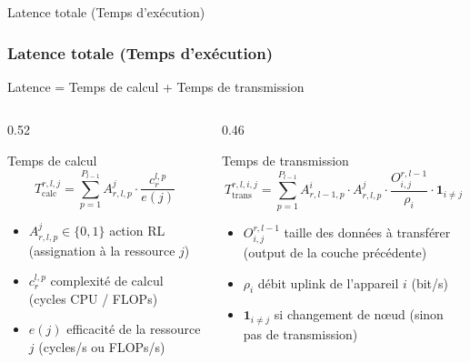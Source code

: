 \documentclass[10pt,aspectratio=169]{beamer}
\begin{document}
\begin{frame}{Latence totale (Temps d'exécution)}
\frametitle{Latence totale (Temps d'exécution)}

Latence = Temps de calcul + Temps de transmission

\bigskip

\begin{columns}[T]  %
\begin{column}{0.52\textwidth}

\begin{block}{Temps de calcul}
\[
T_{\text{calc}}^{r,l,j} = \sum_{p=1}^{P_{l-1}} A^j_{r,l,p} \cdot \frac{c^{l,p}_r}{e(j)}
\]
\end{block}

\begin{itemize}
\item $A^j_{r,l,p} \in \{0,1\}$ \quad action RL (assignation à la ressource $j$)
\item $c^{l,p}_r$ \quad complexité de calcul (cycles CPU / FLOPs)
\item $e(j)$ \quad efficacité de la ressource $j$ (cycles/s ou FLOPs/s)
\end{itemize}

\end{column}

\begin{column}{0.46\textwidth}

\begin{block}{Temps de transmission}
\[
T_{\text{trans}}^{r,l,i,j} = \sum_{p=1}^{P_{l-1}} A^i_{r,{l-1},p} \cdot A^j_{r,l,p} \cdot \frac{O^{r,l-1}_{i,j}}{\rho_i} \cdot \mathbf{1}_{i \neq j}
\]
\end{block}

\begin{itemize}
\item $O^{r,l-1}_{i,j}$ \quad taille des données à transférer (output de la couche précédente)
\item $\rho_i$ \quad débit uplink de l'appareil $i$ (bit/s)
\item $\mathbf{1}_{i \neq j}$  si changement de nœud (sinon pas de transmission)
\end{itemize}

\end{column}
\end{columns}

\end{frame}
\end{document}
